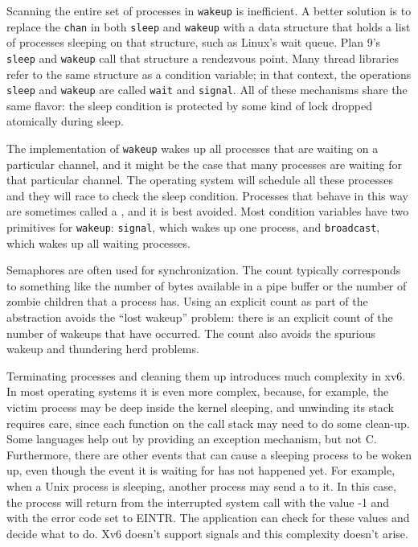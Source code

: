 Scanning the entire set of processes in
\lstinline{wakeup}
is inefficient.  A better solution is to
replace the
\lstinline{chan}
in both
\lstinline{sleep}
and
\lstinline{wakeup}
with a data structure that holds
a list of processes sleeping on that structure,
such as Linux's wait queue.
Plan 9's
\lstinline{sleep}
and
\lstinline{wakeup}
call that structure a rendezvous point.
Many thread libraries refer to the same
structure as a condition variable;
in that context, the operations
\lstinline{sleep}
and
\lstinline{wakeup}
are called
\lstinline{wait}
and
\lstinline{signal}.
All of these mechanisms share the same
flavor: the sleep condition is protected by
some kind of lock dropped atomically during sleep.

The implementation of
\lstinline{wakeup}
wakes up all processes that are waiting on a particular channel, and it might be
the case that many processes are waiting for that particular channel.   The
operating system will schedule all these processes and they will race to check
the sleep condition.  Processes that behave in this way are sometimes called a
,
and it is best avoided.
Most condition variables have two primitives for
\lstinline{wakeup}:
\lstinline{signal},
which wakes up one process, and
\lstinline{broadcast},
which wakes up all waiting processes.

Semaphores are often used for synchronization.
The count typically corresponds to something like
the number of bytes available in a pipe buffer
or the number of zombie children that a process has.
Using an explicit count as part of the abstraction
avoids the ``lost wakeup'' problem:
there is an explicit count of the number
of wakeups that have occurred.
The count also avoids the spurious wakeup
and thundering herd problems.

Terminating processes and cleaning them up introduces much complexity in xv6.
In most operating systems it is even more complex, because, for example, the
victim process may be deep inside the kernel sleeping, and unwinding its
stack requires care, since each function on the call stack
may need to do some clean-up.  Some languages help out by providing
an exception mechanism, but not C.
Furthermore, there are other events that can cause a sleeping process to be
woken up, even though the event it is waiting for has not happened yet.  For
example, when a Unix process is sleeping, another process may send a 
to it.  In this case, the
process will return from the interrupted system call with the value -1 and with
the error code set to EINTR. The application can check for these values and
decide what to do.  Xv6 doesn't support signals and this complexity doesn't arise.

